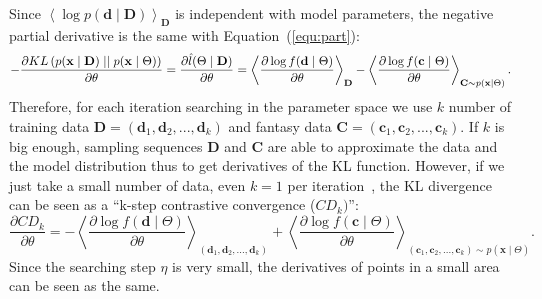 Since $\left \langle \log p(\mathbf{d} \mid \mathbf{D}) \right \rangle_{\mathbf{D}}$ is independent with model parameters, the negative partial derivative is the same with Equation~(\ref{equ:part}):
\begin{equation}
\label{equ:kl}
-\dfrac{\partial KL \left( p(\mathbf{x} \mid \mathbf{D}) \mid \mid p(\mathbf{x} \mid \Theta) \right)}{\partial \theta}
= \dfrac{\partial \hat{l} (\Theta \mid \mathbf{D})}{\partial \theta} \\
= \left \langle \dfrac{\partial \log f(\mathbf{d} \mid \Theta)}{\partial \theta}\right \rangle_{\mathbf{D}} - \left \langle \dfrac{\partial \log f(\mathbf{c} \mid \Theta)}{\partial \theta}\right \rangle_{\mathbf{C} \sim p(\mathbf{x} \mid \Theta)} .
\end{equation}
Therefore, for each iteration searching in the parameter space we use $ k $ number of training data $ \mathbf{D}=(\mathbf{d}_1, \mathbf{d}_2, ..., \mathbf{d}_k) $ and fantasy data $ \mathbf{C}=(\mathbf{c}_1, \mathbf{c}_2, ..., \mathbf{c}_k) $.
If $ k $ is big enough, sampling sequences $ \mathbf{D} $ and $ \mathbf{C} $ are able to approximate the data and the model distribution thus to get derivatives of the KL function.
However, if we just take a small number of data, even $ k = 1 $ per iteration~\cite{hinton2002training}, the KL divergence can be seen as a ``k-step contrastive convergence ($ CD_{k}) $'':
\begin{equation}
\label{equ:cdk}
\dfrac{\partial CD_{k}}{\partial \theta} 
= - \left \langle \dfrac{\partial \log f(\mathbf{d} \mid \Theta)}{\partial \theta}\right \rangle_{(\mathbf{d}_1, \mathbf{d}_2, ..., \mathbf{d}_k) } + \left \langle \dfrac{\partial \log f(\mathbf{c} \mid \Theta)}{\partial \theta}\right \rangle_{(\mathbf{c}_1, \mathbf{c}_2, ..., \mathbf{c}_k) \sim p(\mathbf{x} \mid \Theta)}.
\end{equation}
Since the searching step $ \eta $ is very small, the derivatives of points in a small area can be seen as the same.

